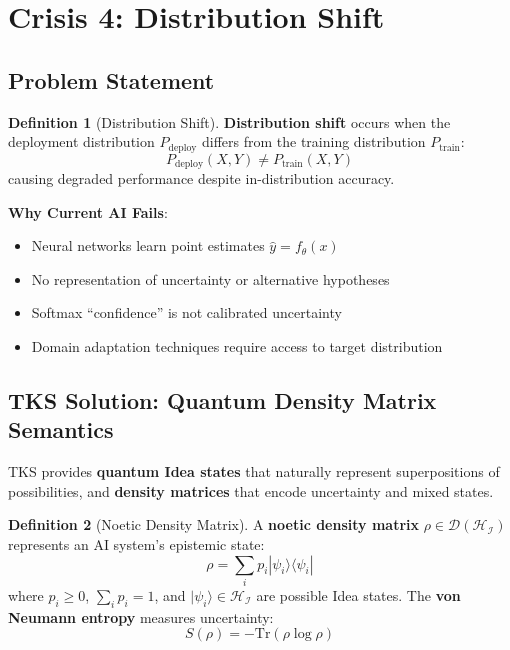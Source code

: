 \documentclass[11pt,twoside]{article}
\theoremstyle{definition}
\newtheorem{definition}{Definition}[section]
\theoremstyle{plain}
\theoremstyle{remark}
\newcommand{\Ideas}{\mathcal{I}}
\newcommand{\Hspace}{\mathcal{H}}
\newcommand{\qket}[1]{|#1\rangle}
\newcommand{\qbra}[1]{\langle #1|}
\newcommand{\DensityMat}{\rho}
\newcommand{\Trace}{\mathrm{Tr}}
\begin{document}
\section{Crisis 4: Distribution Shift}
\label{sec:distribution-shift}

\subsection{Problem Statement}

\begin{definition}[Distribution Shift]
\label{def:distribution-shift}
\textbf{Distribution shift} occurs when the deployment distribution $P_{\mathrm{deploy}}$
differs from the training distribution $P_{\mathrm{train}}$:
\[
P_{\mathrm{deploy}}(X, Y) \neq P_{\mathrm{train}}(X, Y)
\]
causing degraded performance despite in-distribution accuracy.
\end{definition}

\textbf{Why Current AI Fails}:
\begin{itemize}
  \item Neural networks learn point estimates $\hat{y} = f_\theta(x)$
  \item No representation of uncertainty or alternative hypotheses
  \item Softmax ``confidence'' is not calibrated uncertainty
  \item Domain adaptation techniques require access to target distribution
\end{itemize}

\subsection{TKS Solution: Quantum Density Matrix Semantics}

TKS provides \textbf{quantum Idea states} that naturally represent superpositions of
possibilities, and \textbf{density matrices} that encode uncertainty and mixed states.

\begin{definition}[Noetic Density Matrix]
\label{def:noetic-density}
A \textbf{noetic density matrix} $\DensityMat \in \mathcal{D}(\Hspace_{\Ideas})$ represents
an AI system's epistemic state:
\[
\DensityMat = \sum_i p_i \qket{\psi_i}\qbra{\psi_i}
\]
where $p_i \geq 0$, $\sum_i p_i = 1$, and $\qket{\psi_i} \in \Hspace_{\Ideas}$ are possible
Idea states. The \textbf{von Neumann entropy} measures uncertainty:
\[
S(\DensityMat) = -\Trace(\DensityMat \log \DensityMat)
\]
\end{definition}
\end{document}
